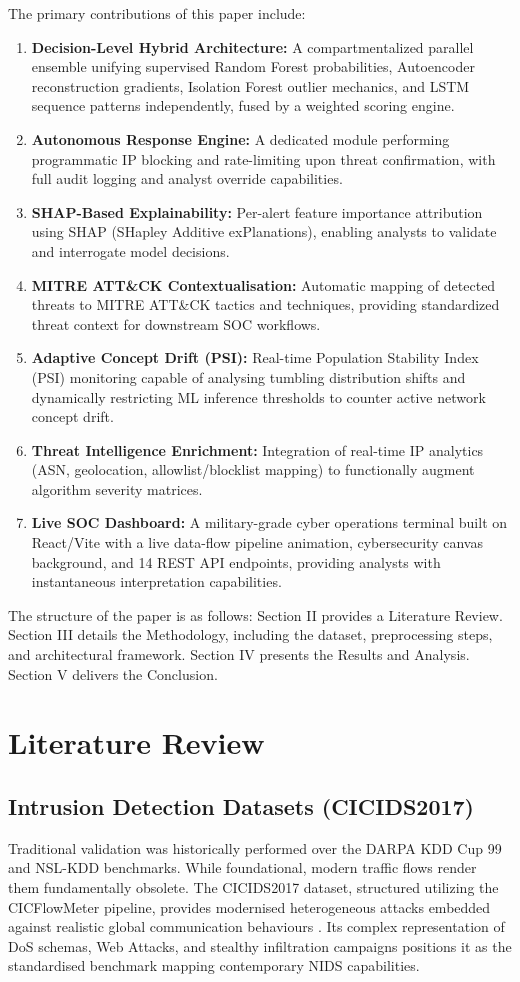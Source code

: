 \documentclass[conference]{IEEEtran}
\begin{document}
The primary contributions of this paper include:
\begin{enumerate}
    \item \textbf{Decision-Level Hybrid Architecture:} A compartmentalized parallel ensemble unifying supervised Random Forest probabilities, Autoencoder reconstruction gradients, Isolation Forest outlier mechanics, and LSTM sequence patterns independently, fused by a weighted scoring engine.
    \item \textbf{Autonomous Response Engine:} A dedicated module performing programmatic IP blocking and rate-limiting upon threat confirmation, with full audit logging and analyst override capabilities.
    \item \textbf{SHAP-Based Explainability:} Per-alert feature importance attribution using SHAP (SHapley Additive exPlanations), enabling analysts to validate and interrogate model decisions.
    \item \textbf{MITRE ATT\&CK Contextualisation:} Automatic mapping of detected threats to MITRE ATT\&CK tactics and techniques, providing standardized threat context for downstream SOC workflows.
    \item \textbf{Adaptive Concept Drift (PSI):} Real-time Population Stability Index (PSI) monitoring capable of analysing tumbling distribution shifts and dynamically restricting ML inference thresholds to counter active network concept drift.
    \item \textbf{Threat Intelligence Enrichment:} Integration of real-time IP analytics (ASN, geolocation, allowlist/blocklist mapping) to functionally augment algorithm severity matrices.
    \item \textbf{Live SOC Dashboard:} A military-grade cyber operations terminal built on React/Vite with a live data-flow pipeline animation, cybersecurity canvas background, and 14 REST API endpoints, providing analysts with instantaneous interpretation capabilities.
\end{enumerate}

The structure of the paper is as follows: Section II provides a Literature Review. Section III details the Methodology, including the dataset, preprocessing steps, and architectural framework. Section IV presents the Results and Analysis. Section V delivers the Conclusion.

\section{Literature Review}
\subsection{Intrusion Detection Datasets (CICIDS2017)}
Traditional validation was historically performed over the DARPA KDD Cup 99 and NSL-KDD benchmarks. While foundational, modern traffic flows render them fundamentally obsolete. The CICIDS2017 dataset, structured utilizing the CICFlowMeter pipeline, provides modernised heterogeneous attacks embedded against realistic global communication behaviours \cite{sharafaldin2018toward}. Its complex representation of DoS schemas, Web Attacks, and stealthy infiltration campaigns positions it as the standardised benchmark mapping contemporary NIDS capabilities.
\end{document}

